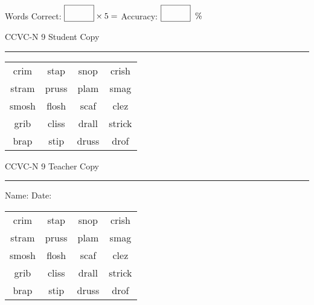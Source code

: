 \documentclass{memoir}
\begin{document}
\small

Words Correct: $\fbox{\phantom{\huge 100}} \times 5 = $ Accuracy: $\fbox{\phantom{\huge 100}}\;\; \%$ 

\vfill

\newpage


\footnotesize \noindent
CCVC-N 9 \hfill Student Copy
\smallskip
\hrule

\Large

\setlength{\tabcolsep}{14pt}
\def\arraystretch{3}

{\selectfont


\begin{vplace}[0.5]
\begin{center}
\begin{tabular}{cccc}
crim & stap & snop & crish \\
stram & pruss       & plam & smag \\
smosh & flosh & scaf & clez \\
grib                    & cliss             & drall & strick \\
brap               & stip & druss & drof \\
\end{tabular}
\end{center}
\end{vplace}

}

\newpage

\footnotesize \noindent
CCVC-N 9 \hfill Teacher Copy
\smallskip
\hrule

\small

\vfill

\noindent
Name: \underline{\hspace{1.75in}} \hfill Date: \underline{\hspace{1in}}

\Large

{\selectfont


\begin{vplace}[0.5]
\begin{center}
\begin{tabular}{cccc}
crim & stap & snop & crish \\
stram & pruss       & plam & smag \\
smosh & flosh & scaf & clez \\
grib                    & cliss             & drall & strick \\
brap               & stip & druss & drof \\
\end{tabular}
\end{center}
\end{vplace}



}
\end{document}
